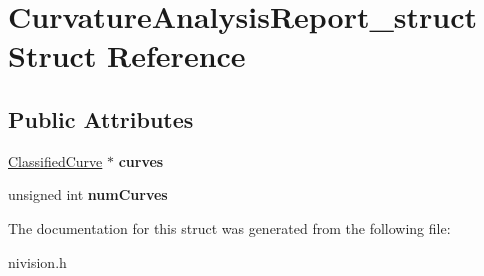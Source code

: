 \hypertarget{structCurvatureAnalysisReport__struct}{
\section{CurvatureAnalysisReport\_\-struct Struct Reference}
\label{structCurvatureAnalysisReport__struct}
}
\subsection*{Public Attributes}
\begin{DoxyCompactItemize}
\item 
\hypertarget{structCurvatureAnalysisReport__struct_a5ed04577380604e4e4b0e121541ab263}{
\hyperlink{structClassifiedCurve__struct}{ClassifiedCurve} $\ast$ {\bfseries curves}}
\label{structCurvatureAnalysisReport__struct_a5ed04577380604e4e4b0e121541ab263}

\item 
\hypertarget{structCurvatureAnalysisReport__struct_adbd635f4d4a762c556a05230a5873a71}{
unsigned int {\bfseries numCurves}}
\label{structCurvatureAnalysisReport__struct_adbd635f4d4a762c556a05230a5873a71}

\end{DoxyCompactItemize}


The documentation for this struct was generated from the following file:\begin{DoxyCompactItemize}
\item 
nivision.h\end{DoxyCompactItemize}
